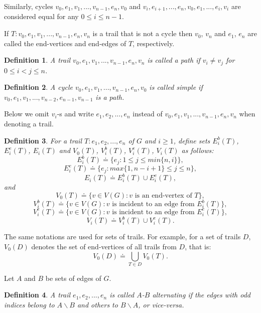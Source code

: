 \documentclass[a4paper, 12pt]{article}
\newtheorem{definition}{Definition}[section]
\begin{document}
Similarly, cycles $v_0, e_1, v_1, ..., v_{n-1}, e_n, v_0$ and $v_i,
e_{i+1}, ..., e_n, v_0, e_1, ..., e_i, v_i$ are considered equal for
any $0 \leq i \leq n-1$.

If $T : v_0, e_1, v_1, ..., v_{n-1}, e_n, v_n$ is a trail that is
not a cycle then $v_0$, $v_n$ and $e_1$, $e_n$ are called the
end-vertices and end-edges of $T$, respectively.

\begin{definition}\label{path_definition}
A trail $v_0, e_1, v_1, ..., v_{n-1}, e_n, v_n$ is called a path if
$v_i \neq v_j$ for $0 \leq i < j \leq n$.
\end{definition}

\begin{definition}\label{simple_cycle_definition}
A cycle $v_0, e_1, v_1, ..., v_{n-1}, e_n, v_0$ is called simple if
$v_0, e_1, v_1, ..., v_{n-2}, e_{n-1}, v_{n-1}$ is a path.
\end{definition}

Below we omit $v_i$-s and write $e_1, e_2, ..., e_n$ instead of
$v_0, e_1, v_1, ..., v_{n-1}, e_n, v_n$ when denoting a trail.

\begin{definition}\label{end_edges_and_vertices}
For a trail $T : e_1, e_2, ..., e_n$ of $G$ and $i \geq 1$, define
sets $E_i^b(T)$, $E_i^e(T)$, $E_i(T)$ and $V_0(T)$, $V_i^b(T)$,
$V_i^e(T)$, $V_i(T)$ as follows:
$$E_i^b(T) \doteq \{ e_j : 1 \leq j \leq min\{n, i\} \},$$
$$E_i^e(T) \doteq \{ e_j : max\{1, n-i+1\} \leq j \leq n \},$$
$$E_i(T) \doteq E_i^b(T) \cup E_i^e(T),$$
and
$$V_0(T) \doteq \{ v \in V(G) : v \text{ is an end-vertex of } T \},$$
$$V_i^b(T) \doteq \{ v \in V(G) : v \text{ is incident to an edge from } E_i^b(T) \},$$
$$V_i^e(T) \doteq \{ v \in V(G) : v \text{ is incident to an edge from } E_i^e(T) \},$$
$$V_i(T) \doteq V_i^b(T) \cup V_i^e(T).$$
\end{definition}

The same notations are used for sets of trails. For example, for a
set of trails $D$, $V_0(D)$ denotes the set of end-vertices of all
trails from $D$, that is:
$$V_0(D) \doteq \bigcup_{T \in D}V_0(T).$$

Let $A$ and $B$ be sets of edges of $G$.
\begin{definition}\label{alt_trail_definition}
A trail $e_1, e_2, ..., e_n$ is called $A$-$B$ alternating if the
edges with odd indices belong to $A \backslash B$ and others to $B
\backslash A$, or vice-versa.
\end{definition}
\end{document}

